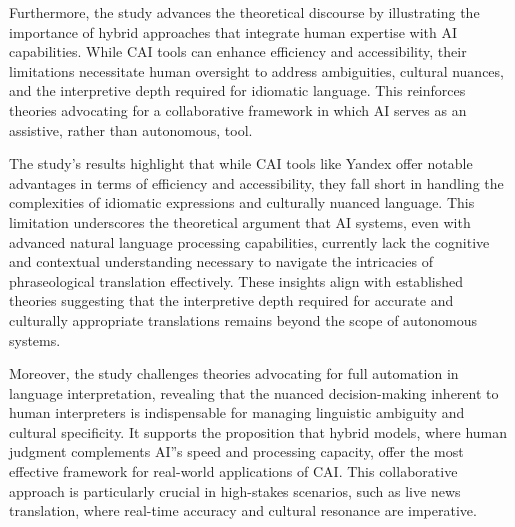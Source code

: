 Furthermore, the study advances the theoretical discourse by
illustrating the importance of hybrid approaches that integrate human
expertise with AI capabilities. While CAI tools can enhance efficiency
and accessibility, their limitations necessitate human oversight to
address ambiguities, cultural nuances, and the interpretive depth
required for idiomatic language. This reinforces theories advocating for
a collaborative framework in which AI serves as an assistive, rather
than autonomous, tool.

The study's results highlight that while CAI tools like
Yandex offer notable advantages in terms of efficiency and
accessibility, they fall short in handling the complexities of idiomatic
expressions and culturally nuanced language. This limitation underscores
the theoretical argument that AI systems, even with advanced natural
language processing capabilities, currently lack the cognitive and
contextual understanding necessary to navigate the intricacies of
phraseological translation effectively. These insights align with
established theories suggesting that the interpretive depth required for
accurate and culturally appropriate translations remains beyond the
scope of autonomous systems.

Moreover, the study challenges theories advocating for full automation
in language interpretation, revealing that the nuanced decision-making
inherent to human interpreters is indispensable for managing linguistic
ambiguity and cultural specificity. It supports the proposition that
hybrid models, where human judgment complements AI''s
speed and processing capacity, offer the most effective framework for
real-world applications of CAI. This collaborative approach is
particularly crucial in high-stakes scenarios, such as live news
translation, where real-time accuracy and cultural resonance are
imperative.
